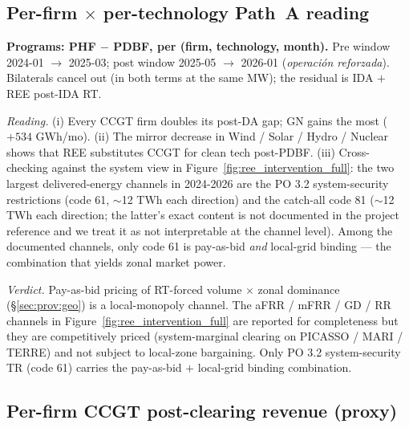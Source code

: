 \documentclass[11pt,a4paper]{article}
\begin{document}
\subsection{Per-firm $\times$ per-technology Path~A reading}\label{sec:prov:phf_minus_pdbf:perfirm}

\noindent \textbf{Programs: PHF $-$ PDBF, per (firm, technology, month).} Pre window 2024-01 $\to$ 2025-03; post window 2025-05 $\to$ 2026-01 (\emph{operación reforzada}). Bilaterals cancel out (in both terms at the same MW); the residual is IDA $+$ REE post-IDA RT.

\begin{table}[H]
\centering
\caption{\textbf{Post-DA intervention by firm and technology, GWh / month.} \textbf{Programs: PHF $-$ PDBF}, same construction as Table~\ref{tab:gap_pretrends} but resolved per firm. The bilateral channel (PDBF $-$ PDBC) is small for CCGT (Table~\ref{tab:bilat_check}); does \emph{not} drive this gap.}
\label{tab:phf_pdbf_alltech}

\end{table}

\textit{Reading.} (i) Every CCGT firm doubles its post-DA gap; GN gains the most ($+534$ GWh/mo). (ii) The mirror decrease in Wind / Solar / Hydro / Nuclear shows that REE substitutes CCGT for clean tech post-PDBF. (iii) Cross-checking against the system view in Figure~\ref{fig:ree_intervention_full}: the two largest delivered-energy channels in 2024-2026 are the PO 3.2 system-security restrictions (code 61, $\sim$12 TWh each direction) and the catch-all code 81 ($\sim$12 TWh each direction; the latter's exact content is not documented in the project reference and we treat it as not interpretable at the channel level). Among the documented channels, only code 61 is pay-as-bid \emph{and} local-grid binding --- the combination that yields zonal market power.

\textit{Verdict.} Pay-as-bid pricing of RT-forced volume $\times$ zonal dominance (\S\ref{sec:prov:geo}) is a local-monopoly channel. The aFRR / mFRR / GD / RR channels in Figure~\ref{fig:ree_intervention_full} are reported for completeness but they are competitively priced (system-marginal clearing on PICASSO / MARI / TERRE) and not subject to local-zone bargaining. Only PO 3.2 system-security TR (code 61) carries the pay-as-bid $+$ local-grid binding combination.

\subsection{Per-firm CCGT post-clearing revenue (proxy)}\label{sec:prov:phf_minus_pdbf:revenue}
\end{document}
